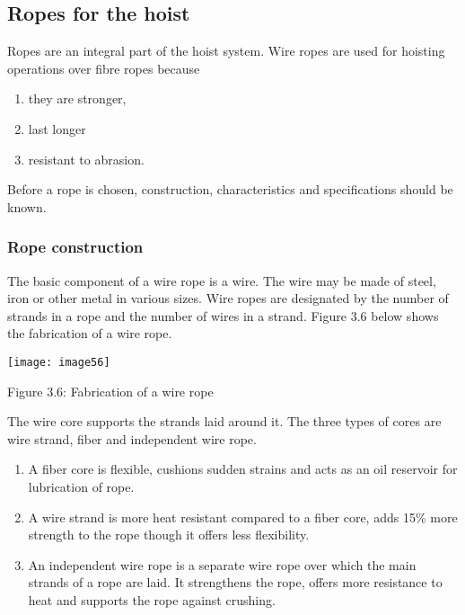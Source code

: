 \subsection{ Ropes for the hoist }

\noindent Ropes are an integral part of the hoist system. Wire ropes are used for hoisting operations over fibre ropes because\par

\begin{enumerate}
\item  they are stronger,

\item  last longer 

\item  resistant to abrasion. 
\end{enumerate}

\noindent Before a rope is chosen, construction, characteristics and specifications should be known.


\subsubsection{ Rope construction}

\noindent The basic component of a wire rope is a wire. The wire may be made of steel, iron or other metal in various sizes. Wire ropes are designated by the number of strands in a rope and the number of wires in a strand. Figure 3.6 below shows the fabrication of a wire rope.\par

\noindent \texttt{[image: image56]}

\noindent Figure 3.6: Fabrication of a wire rope 

\noindent 

\noindent The wire core supports the strands laid around it. The three types of cores are wire strand, fiber and independent wire rope.\par

\begin{enumerate}
\item  A fiber core is flexible, cushions sudden strains and acts as an oil reservoir for lubrication of rope. 

\item  A wire strand is more heat resistant compared to a fiber core, adds 15\% more strength to the rope though it offers less flexibility.

\item  An independent wire rope is a separate wire rope over which the main strands of a rope are laid. It strengthens the rope, offers more resistance to heat and supports the rope against crushing.
\end{enumerate}

